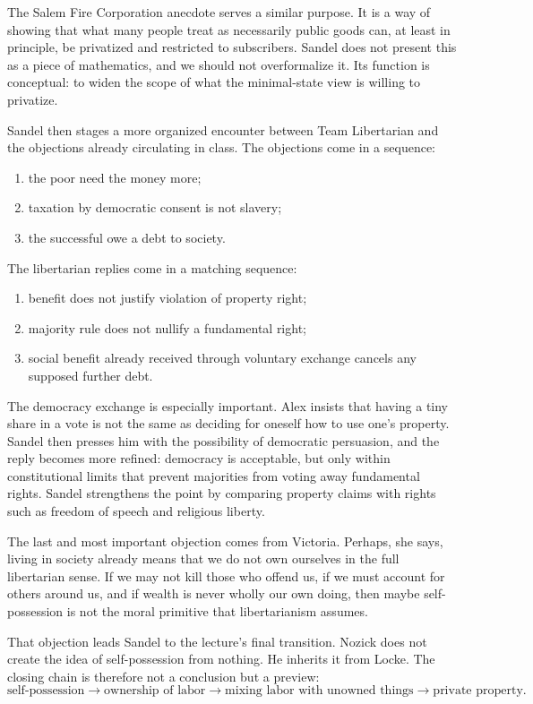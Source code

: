 The Salem Fire Corporation anecdote serves a similar purpose. It is a way of showing that what many people treat as necessarily public goods can, at least in principle, be privatized and restricted to subscribers. Sandel does not present this as a piece of mathematics, and we should not overformalize it. Its function is conceptual: to widen the scope of what the minimal-state view is willing to privatize.

Sandel then stages a more organized encounter between Team Libertarian and the objections already circulating in class. The objections come in a sequence:
\begin{enumerate}
\item the poor need the money more;
\item taxation by democratic consent is not slavery;
\item the successful owe a debt to society.
\end{enumerate}
The libertarian replies come in a matching sequence:
\begin{enumerate}
\item benefit does not justify violation of property right;
\item majority rule does not nullify a fundamental right;
\item social benefit already received through voluntary exchange cancels any supposed further debt.
\end{enumerate}

The democracy exchange is especially important. Alex insists that having a tiny share in a vote is not the same as deciding for oneself how to use one's property. Sandel then presses him with the possibility of democratic persuasion, and the reply becomes more refined: democracy is acceptable, but only within constitutional limits that prevent majorities from voting away fundamental rights. Sandel strengthens the point by comparing property claims with rights such as freedom of speech and religious liberty.

The last and most important objection comes from Victoria. Perhaps, she says, living in society already means that we do not own ourselves in the full libertarian sense. If we may not kill those who offend us, if we must account for others around us, and if wealth is never wholly our own doing, then maybe self-possession is not the moral primitive that libertarianism assumes.

That objection leads Sandel to the lecture's final transition. Nozick does not create the idea of self-possession from nothing. He inherits it from Locke. The closing chain is therefore not a conclusion but a preview:
\begin{equation}
\text{self-possession}\to \text{ownership of labor}\to \text{mixing labor with unowned things}\to \text{private property}.
\end{equation}


